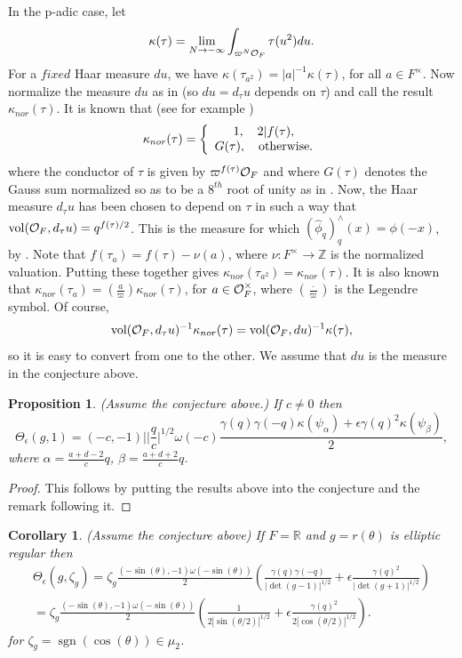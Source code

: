 \documentclass[12pt,letterpaper]{book}
\theoremstyle{plain}
\newtheorem{proposition}[theorem]{Proposition}
\newtheorem{corollary}[theorem]{Corollary}
\theoremstyle{definition}
\theoremstyle{remark}
\theoremstyle{remark}
\DeclareMathOperator{\sgn}{sgn}
\begin{document}
In the p-adic case, let
\[
\kappa(\tau)=\lim_{N\rightarrow - \infty}
\int_{\varpi^N{\cal O}_F}
\tau(u^2) du.
\]
For a $fixed$ Haar measure $du$, we have
$\kappa(\tau_{a^2})=|a|^{-1}\kappa(\tau)$, for all
$a\in F^\times$. Now normalize the measure $du$ as in \cite{Mo3}
(so $du=d_\tau u$ depends on $\tau$) and
call the result $\kappa_{nor}(\tau)$. It is known
that (see for example \cite{Mo3})
\[
\kappa_{nor}(\tau)=
\left\{
    \begin{array}{c}
    1,\ \ \ 2|f(\tau),\\
    G(\tau),\ \ \ {\rm otherwise}.
    \end{array}
\right.
\]
where the conductor of $\tau$ is given by
$\varpi^{f(\tau)}{\cal O}_F$ and where $G(\tau)$ denotes the Gauss sum
normalized so as to be a $8^{th}$ root of unity as in \cite{Mo3}.
Now, the Haar measure $d_\tau u$ has been chosen to depend on
$\tau$ in such a way that $\operatorname{vol}({\cal O}_F,d_\tau u)=q^{f(\tau)/2}$.
This is the measure for which $(\hat{\phi}_q)^\wedge_q(x)=\phi(-x)$,
by \cite{Shal}.
Note that $f(\tau_a)=f(\tau)-\nu(a)$, where
$\nu : F^\times \rightarrow {\mathbb{Z}}$ is the normalized
valuation. Putting these together gives
$\kappa_{nor}(\tau_{a^2})=\kappa_{nor}(\tau)$. It is also known that
$\kappa_{nor}(\tau_{a})=({\frac{a}{\varpi}})\kappa_{nor}(\tau)$, for
$a\in {\cal O}_F^\times$, where $\left(\frac{\cdot}{\varpi}\right)$ is the
Legendre symbol. Of course,
\[
\operatorname{vol}({\cal O}_F,d_\tau u)^{-1}
\kappa_{nor}(\tau)
=\operatorname{vol}({\cal O}_F,du)^{-1}\kappa(\tau),
\]
so it is easy to convert from one to the other.
We assume that $du$ is the measure in the conjecture above.

\begin{proposition} (Assume the conjecture above.)
If $c\not= 0$ then
\[
\Theta_\epsilon (g,1)=
(-c,-1)||{\frac{q}{c}}|^{1/2}\omega(-c)
{\frac{\gamma(q)\gamma(-q)\kappa(\psi_\alpha)+
\epsilon \gamma(q)^2\kappa(\psi_\beta)}{2}},
\]
where $\alpha={\frac{a+d-2}{c}}q$, $\beta={\frac{a+d+2}{c}}q$.
\end{proposition}

\begin{proof} This follows by putting the results above into the conjecture
and the remark following it.
\end{proof}

\begin{corollary} (Assume the conjecture above)
If $F={\mathbb{R}}$ and
$g=r(\theta)$ is elliptic regular then
\[
\begin{array}{c}
\Theta_\epsilon (g,\zeta_g)=
\zeta_g
{\frac{(-\sin(\theta),-1)\omega(-\sin(\theta))}{2}}
({\frac{\gamma(q)\gamma(-q)}{|\det(g-1)|^{1/2}}}
+\epsilon {\frac{\gamma(q)^2}{|\det(g+1)|^{1/2}}})\\
=\zeta_g
{\frac{(-\sin(\theta),-1)\omega(-\sin(\theta))}{2}}
({\frac{1}{2|\sin(\theta /2)|^{1/2}}}
+\epsilon {\frac{\gamma(q)^2}{2|\cos(\theta/2)|^{1/2}}}).
\end{array}
\]
for $\zeta_g=\sgn(\cos(\theta))\in \mu_2$.
\end{corollary}
\end{document}
